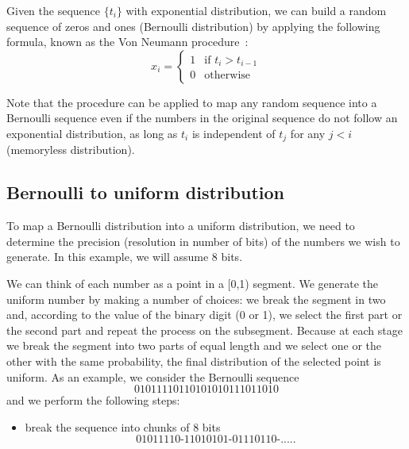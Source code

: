 \documentclass[justified,sixbynine]{tufte-book}
\theoremstyle{plain}%
\theoremstyle{definition}
\theoremstyle{remark}
\begin{document}
\begin{fullwidth}

Given the sequence $\{t_i\}$ with exponential distribution, we can build a
random sequence of zeros and ones (Bernoulli distribution) by applying the following formula, known as the Von Neumann procedure~\cite{bits}:
\begin{equation}
x_i=\left\{
\begin{array}{ll}
1 & \text{if }t_{i}>t_{i-1} \\
0 & \text{otherwise}
\end{array}
\right.
\end{equation}

Note that the procedure can be applied to map any random sequence into
a Bernoulli sequence even if the numbers in the original sequence do not
follow an exponential distribution, as long as $t_i$ is independent of $t_j$
for any $j<i$ (memoryless distribution).

\goodbreak\subsection{Bernoulli to uniform distribution}


To map a Bernoulli distribution into a uniform distribution, we need
to determine the precision (resolution in number of bits) of the numbers we wish
to generate. In this example, we will assume 8 bits.

We can think of each number as a point in a [0,1) segment. We generate the
uniform number by making a number of choices: we break the segment in two
and, according to the value of the binary digit (0 or 1), we select the first
part or the second part and repeat the process on the subsegment. Because
at each stage we break the segment into two parts of equal length and we
select one or the other with the same probability, the final distribution of
the selected point is uniform. As an example, we consider the Bernoulli
sequence
\begin{equation}
01011110110101010111011010
\end{equation}
and we perform the following steps:

\begin{itemize}
\item  break the sequence into chunks of 8 bits
\begin{equation}
\text{01011110-11010101-01110110-.....}
\end{equation}


\end{itemize}
\end{fullwidth}
\end{document}
